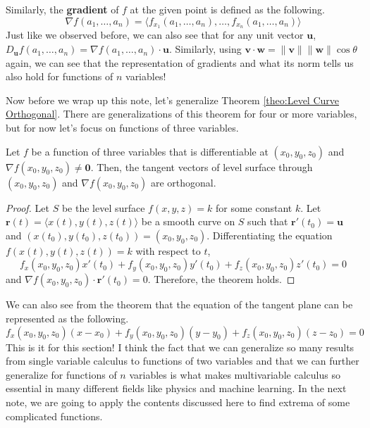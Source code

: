 \documentclass[../../../main.tex]{subfiles}
\begin{document}
Similarly, the \textbf{gradient} of $f$ at the given point is
defined as the following.
\[
\nabla f(a_1, \ldots, a_n)
= \langle
    f_{x_1}(a_1, \ldots, a_n), \ldots, f_{x_n}(a_1, \ldots, a_n)
\rangle
\]
Just like we observed before, we can also see that for any unit vector
$\mathbf{u}$, $D_\mathbf{u} f(a_1, \ldots, a_n) =
\nabla f(a_1, \ldots, a_n) \cdot \mathbf{u}$. Similarly, using
$\mathbf{v} \cdot \mathbf{w} = \| \mathbf{v} \| \| \mathbf{w} \|
\cos\theta$ again, we can see that the representation of gradients
and what its norm tells us also hold for functions of $n$ variables!

Now before we wrap up this note, let's generalize Theorem
\ref{theo:Level Curve Orthogonal}. There are generalizations of
this theorem for four or more variables, but for now let's focus
on functions of three variables.

\begin{theorem}{}{}
Let $f$ be a function of three variables that is differentiable at
$(x_0, y_0, z_0)$ and $\nabla f(x_0, y_0, z_0) \neq \mathbf{0}$.
Then, the tangent vectors of level surface through $(x_0, y_0, z_0)$
and $\nabla f(x_0, y_0, z_0)$ are orthogonal.
\end{theorem}
\begin{proof}
Let $S$ be the level surface $f(x, y, z) = k$ for some constant $k$.
Let $\mathbf{r}(t) = \langle x(t), y(t), z(t) \rangle$ be a
smooth curve on $S$ such that $\mathbf{r}'(t_0) = \mathbf{u}$ and
$(x(t_0), y(t_0), z(t_0)) = (x_0, y_0, z_0)$. Differentiating the
equation $f(x(t), y(t), z(t)) = k$ with respect to $t$,
\[
f_x(x_0, y_0, z_0) x'(t_0) +
f_y(x_0, y_0, z_0) y'(t_0) +
f_z(x_0, y_0, z_0) z'(t_0) = 0
\]
and $\nabla f(x_0, y_0, z_0) \cdot \mathbf{r}'(t_0) = 0$. Therefore,
the theorem holds.
\end{proof}

We can also see from the theorem that the equation of the tangent
plane can be represented as the following.
\[
f_x(x_0, y_0, z_0) (x - x_0) +
f_y(x_0, y_0, z_0) (y - y_0) +
f_z(x_0, y_0, z_0) (z - z_0) = 0
\]
This is it for this section! I think the fact that we can generalize
so many results from single variable calculus to functions of two
variables and that we can further generalize for functions of $n$
variables is what makes multivariable calculus so essential in many
different fields like physics and machine learning. In the next note,
we are going to apply the contents discussed here to find extrema
of some complicated functions.
\end{document}
